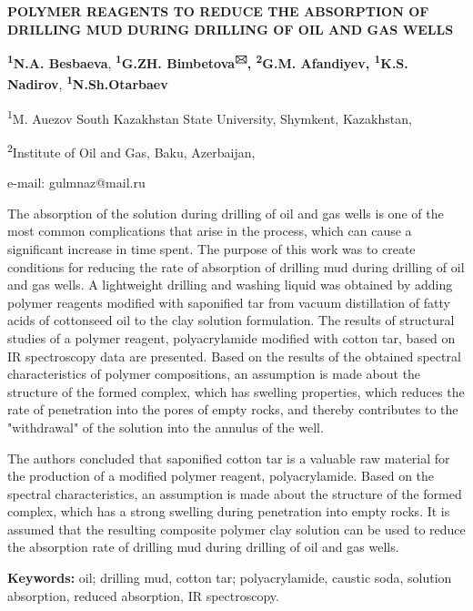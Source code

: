 \begin{center}
{\large\bfseries POLYMER REAGENTS TO REDUCE THE ABSORPTION OF DRILLING MUD DURING
DRILLING OF OIL AND GAS WELLS}

{\bfseries \textsuperscript{1}N.A. Besbaeva},
{\bfseries \textsuperscript{1}G.ZH. Bimbetova\textsuperscript{🖂},
\textsuperscript{2}G.M. Afandiyev, \textsuperscript{1}K.S. Nadirov},
{\bfseries \textsuperscript{1}N.Sh.Otarbaev}

\textsuperscript{1}M. Auezov South Kazakhstan State University,
Shymkent, Kazakhstan,

\textsuperscript{2}Institute of Oil and Gas, Baku, Azerbaijan,

e-mail: gulmnaz@mail.ru
\end{center}

The absorption of the solution during drilling of oil and gas wells is
one of the most common complications that arise in the process, which
can cause a significant increase in time spent. The purpose of this work
was to create conditions for reducing the rate of absorption of drilling
mud during drilling of oil and gas wells. A lightweight drilling and
washing liquid was obtained by adding polymer reagents modified with
saponified tar from vacuum distillation of fatty acids of cottonseed oil
to the clay solution formulation. The results of structural studies of a
polymer reagent, polyacrylamide modified with cotton tar, based on IR
spectroscopy data are presented. Based on the results of the obtained
spectral characteristics of polymer compositions, an assumption is made
about the structure of the formed complex, which has swelling
properties, which reduces the rate of penetration into the pores of
empty rocks, and thereby contributes to the "withdrawal" of the solution
into the annulus of the well.

The authors concluded that saponified cotton tar is a valuable raw
material for the production of a modified polymer reagent,
polyacrylamide. Based on the spectral characteristics, an assumption is
made about the structure of the formed complex, which has a strong
swelling during penetration into empty rocks. It is assumed that the
resulting composite polymer clay solution can be used to reduce the
absorption rate of drilling mud during drilling of oil and gas wells.

{\bfseries Keywords:} oil; drilling mud, cotton tar; polyacrylamide,
caustic soda, solution absorption, reduced absorption, IR spectroscopy.

